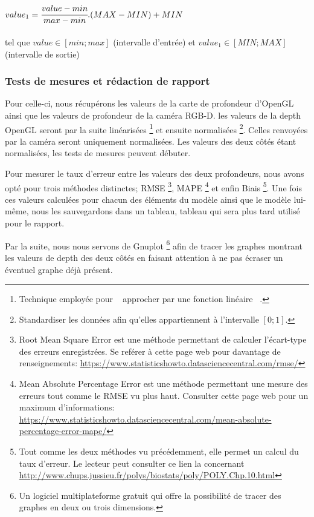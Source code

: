 \documentclass[a4paper, 12pt]{book}
\begin{document}
$ value_{1} = \cfrac{value - min}{max - min}.(MAX - MIN) + MIN$ \\ \\ tel que $  value\in \left[min;max\right] $ (intervalle d'entrée) et $ value_{1}\in \left[MIN;MAX\right] $ (intervalle de sortie)  \\

\subsubsection{Tests de mesures et rédaction de rapport}
Pour celle-ci, nous récupérons les valeurs de la carte de profondeur d'OpenGL ainsi que les valeurs de profondeur de la caméra RGB-D. les valeurs de la depth OpenGL seront par la suite linéarisées \footnote{Technique employée pour \guillemotleft{}~ approcher par une fonction linéaire ~\guillemotright{}.} et ensuite normalisées \footnote{Standardiser les données afin qu'elles appartiennent à l'intervalle $ \left[0;1\right] $.}. Celles renvoyées par la caméra seront uniquement normalisées. Les valeurs des deux côtés étant normalisées, les tests de mesures peuvent débuter. \par Pour mesurer le taux d'erreur entre les valeurs des deux profondeurs, nous avons opté pour trois méthodes distinctes; RMSE \footnote{Root Mean Square Error est une méthode permettant de calculer l'écart-type des erreurs enregistrées. Se reférer à cette page web pour davantage de renseignements: \url{https://www.statisticshowto.datasciencecentral.com/rmse/}}, MAPE \footnote{Mean Absolute Percentage Error est une méthode permettant une mesure des erreurs tout comme le RMSE vu plus haut. Consulter cette page web pour un maximum d'informations: \url{https://www.statisticshowto.datasciencecentral.com/mean-absolute-percentage-error-mape/} } et enfin Biais \footnote{Tout comme les deux méthodes vu précédemment, elle permet un calcul du taux d'erreur. Le lecteur peut consulter ce lien la concernant \url{http://www.chups.jussieu.fr/polys/biostats/poly/POLY.Chp.10.html}}. Une fois ces valeurs calculées pour chacun des éléments du modèle ainsi que le modèle lui-même, nous les sauvegardons dans un tableau, tableau qui sera plus tard utilisé pour le rapport. \par Par la suite, nous nous servons de Gnuplot \footnote{Un logiciel multiplateforme gratuit qui offre la possibilité de tracer des graphes en deux ou trois dimensions.} afin de tracer les graphes montrant les valeurs de depth des deux côtés en faisant attention à ne pas écraser un éventuel graphe déjà présent. 
\end{document}
